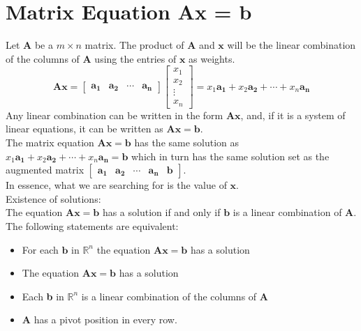 \documentclass[nobib]{tufte-handout}
\begin{document}
\section{Matrix Equation \textbf{Ax} = \textbf{b}}
Let $\mathbf{A}$ be a $m\times n$ matrix. The product of $\mathbf{A}$ and $\mathbf{x}$ will be the linear combination of the columns of $\mathbf{A}$ using the entries of $\mathbf{x}$ as weights.
\begin{equation*}
    \mathbf{A}\mathbf{x} =
    \begin{bmatrix}
        \mathbf{a_1} & \mathbf{a_2} & \cdots & \mathbf{a_n}
    \end{bmatrix}
    \begin{bmatrix}
        x_1    \\
        x_2    \\
        \vdots \\
        x_n
    \end{bmatrix} =
    x_1\mathbf{a_1}+x_2\mathbf{a_2}+\cdots+ x_n\mathbf{a_n}
\end{equation*}
Any linear combination can be written in the form $\mathbf{A}\mathbf{x}$, and, if it is a system of linear equations, it can be written as $\mathbf{A}\mathbf{x}=\mathbf{b}$.\\
The matrix equation $\mathbf{A}\mathbf{x}=\mathbf{b}$ has the same solution as $x_1\mathbf{a_1}+x_2\mathbf{a_2}+\cdots+ x_n\mathbf{a_n} = \mathbf{b}$ which in turn has the same solution set as the augmented matrix $\begin{bmatrix}\mathbf{a_1} & \mathbf{a_2} & \cdots & \mathbf{a_n} & \mathbf{b}\end{bmatrix}$.\\
In essence, what we are searching for is the value of $\mathbf{x}$.\\
Existence of solutions:\\
The equation $\mathbf{A}\mathbf{x} =\mathbf{b}$ has a solution if and only if
$\mathbf{b}$ is a linear combination of $\mathbf{A}$.\\ The following
statements are equivalent:
\begin{itemize}
    \item For each $\mathbf{b}$ in $\mathbb{R}^n$ the equation
          $\mathbf{A}\mathbf{x}=\mathbf{b}$ has a solution
    \item The equation $\mathbf{A}\mathbf{x}=\mathbf{b}$ has a solution
    \item Each \textbf{b} in $\mathbb{R}^n$ is a linear combination of the columns of
          $\mathbf{A}$
    \item $\mathbf{A}$ has a pivot position in every row.
\end{itemize}
\end{document}
